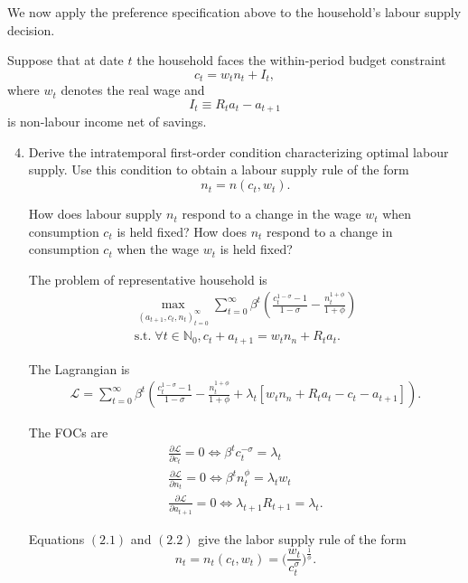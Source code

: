 \documentclass[dvipsnames,11pt]{article}
\begin{document}
    \noindent We now apply the preference specification above to the household’s labour supply decision.
    
    \medskip
    
    \noindent Suppose that at date $t$ the household faces the within-period budget constraint
    \[
    c_t = w_t n_t + I_t,
    \]
    where $w_t$ denotes the real wage and
    \[
    I_t \equiv R_t a_t - a_{t+1}
    \]
    is non-labour income net of savings.
    
    \begin{enumerate}
    \setcounter{enumi}{3}
        \item Derive the intratemporal first-order condition characterizing optimal labour supply. Use this condition to obtain a labour supply rule of the form
        \[
        n_t = n(c_t, w_t).
        \]
        
        How does labour supply $n_t$ respond to a change in the wage $w_t$ when consumption $c_t$ is held fixed? How does $n_t$ respond to a change in consumption $c_t$ when the wage $w_t$ is held fixed?

        \begin{solution}

The problem of representative household is 
\begin{gather*}
    \max_{(a_{t+1},c_t,n_t)_{t=0}^\infty}\sum_{t=0}^\infty \beta^t(\frac{c_t^{1-\sigma}-1}{1-\sigma}-\frac{n_t^{1+\phi}}{1+\phi}) \\ \mathrm{s.t.}\; \forall t \in \mathbb{N}_0,c_t+a_{t+1} = w_tn_n+R_ta_t.
\end{gather*}

The Lagrangian is 
\begin{gather*}
    \mathcal{L}=\sum_{t=0}^\infty \beta^t(\frac{c_t^{1-\sigma}-1}{1-\sigma}-\frac{n_t^{1+\phi}}{1+\phi} +\lambda_t[w_tn_n+R_ta_t-c_t-a_{t+1}]). 
\end{gather*}

The FOCs are 
\begin{gather}
    \frac{\partial\mathcal{L}}{\partial c_t}= 0 \iff \beta^tc_t^{-\sigma}=\lambda_t \\ \frac{\partial\mathcal{L}}{\partial n_t}=0 \iff \beta^tn_t^\phi=\lambda_tw_t \\ \frac{\partial\mathcal{L}}{\partial a_{t+1}}=0 \iff \lambda_{t+1}R_{t+1}= \lambda_t.
\end{gather}

Equations $(2.1)$ and $(2.2)$ give the labor supply rule of the form 
\begin{equation}
    n_t=n_t(c_t,w_t) = \Big(\frac{w_t}{c_t^\sigma}\Big)^{\frac{1}{\phi}}. \label{Euler_Labor}
\end{equation}


\end{solution}
\end{enumerate}
\end{document}
